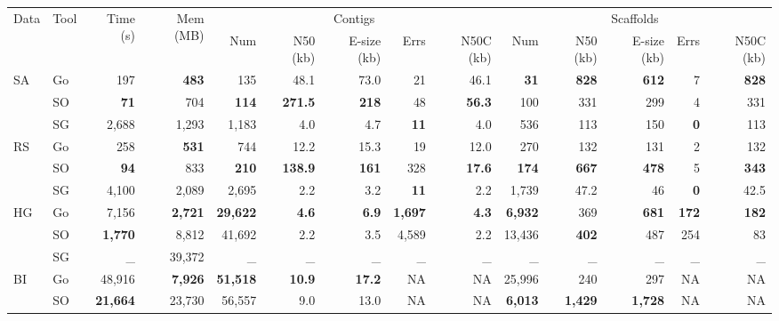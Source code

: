 \documentclass{bioinfo}
\newcommand{\best}[1]{\bf{#1}}
\begin{document}
\begin{table*}

\vspace{-1em}

\begin{center}
\footnotesize
{\begin{tabular}[t]{ll|rr|rrrrr|rrrrr}
\multirow{2}{*}{Data} & \multirow{2}{*}{Tool} & \multirow{2}{*}{Time (s)} & \multirow{2}{*}{Mem (MB)} & \multicolumn{5}{c}{Contigs} & \multicolumn{5}{c}{Scaffolds} \\
 & & & & Num & N50 (kb) & E-size (kb) & Errs & N50C (kb) & Num & N50 (kb) & E-size (kb) & Errs & N50C (kb) \\

\hline
\multirow{3}{*}{SA} 
	& Go 	& 197 	& \best{483} 	& 135 	& 48.1 	& 73.0 	& 21 	& 46.1 	& \best{31} 	& \best{828} 	& \best{612} 	& 7 	& \best{828} \\
	& SO 	& \best{71} 	& 704 	& \best{114} 	& \best{271.5} 	& \best{218} 	& 48 	& \best{56.3} 	& 100 	& 331 	& 299 	& 4 	& 331 \\
	& SG 	& 2,688 	& 1,293 	& 1,183 	& 4.0 	& 4.7 	& \best{11} 	& 4.0 	& 536 	& 113 	& 150 	& \best{0} 	& 113 \\

\hline
\multirow{3}{*}{RS} 
	& Go 	& 258 	& \best{531} 	& 744 	& 12.2 	& 15.3 	& 19 	& 12.0 	& 270 	& 132 	& 131 	& 2 	& 132 \\
	& SO 	& \best{94} 	& 833 	& \best{210} 	& \best{138.9} 	& \best{161} 	& 328 	& \best{17.6} 	& \best{174} 	& \best{667} 	& \best{478} 	& 5 	& \best{343} \\
	& SG 	& 4,100 	& 2,089 	& 2,695 	& 2.2 	& 3.2 	& \best{11} 	& 2.2 	& 1,739 	& 47.2 	& 46 	& \best{0} 	& 42.5 \\

\hline
\multirow{3}{*}{HG} 
	& Go 	& 7,156 	& \best{2,721} 	& \best{29,622} 	& \best{4.6} 	& \best{6.9} 	& \best{1,697} 	& \best{4.3} 	& \best{6,932} 	& 369 	& \best{681} 	& \best{172} 	& \best{182} \\
	& SO 	& \best{1,770} 	& 8,812 	& 41,692 	& 2.2 	& 3.5 	& 4,589 	& 2.2 	& 13,436 	& \best{402} 	& 487 	& 254 	& 83 \\
	& SG 	& \_ 	& 39,372 	& \_ 	& \_ 	& \_ 	& \_ 	& \_ 	& \_ 	& \_ 	& \_ 	& \_ 	& \_\\

\hline
\multirow{2}{*}{BI}
	& Go 	& 48,916 	& \best{7,926} 	& \best{51,518} 	& \best{10.9} 	& \best{17.2} 	& NA 	& NA 	& 25,996 	& 240 	& 297 	& NA 	& NA \\
	& SO 	& \best{21,664} 	& 23,730 	& 56,557 	& 9.0 	& 13.0 	& NA 	& NA 	& \best{6,013} 	& \best{1,429} 	& \best{1,728} 	& NA 	& NA \\
\end{tabular}}
\end{center}


\end{table*}
\end{document}
